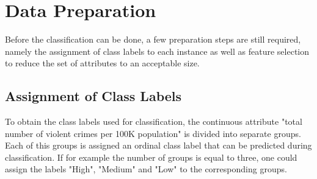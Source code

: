 \section{Data Preparation}

Before the classification can be done, a few preparation steps are still
required, namely the assignment of class labels to each instance as
well as feature selection to reduce the set of attributes to an
acceptable size.

\subsection{Assignment of Class Labels}
\label{sec:assignment}

To obtain the class labels used for classification, the
continuous attribute "total number of violent crimes per 100K
population" is divided into separate groups. Each of this groups is
assigned an ordinal class label that can be predicted during classification.
If for example the number of groups is equal to three, one could
assign the labels "High", "Medium" and "Low" to the corresponding
groups.

